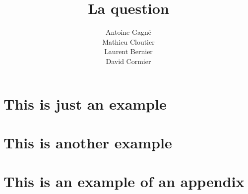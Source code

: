 \documentclass[12pt, lof, lot, lol]{GDD}
\author{%
    Antoine Gagné \\%
    Mathieu Cloutier \\%
    Laurent Bernier \\%
    David Cormier%
}
\title{La question}
\begin{document}
\chapter{This is just an example}
\lipsum

\chapter{This is another example}
\lipsum

\appendix

\chapter{This is an example of an appendix}
\lipsum
\end{document}
